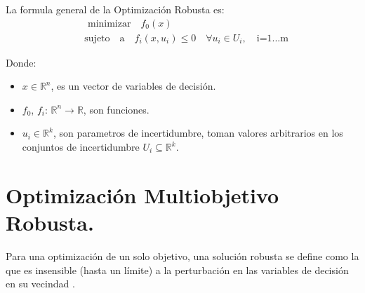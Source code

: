 
La formula general de la Optimización Robusta es:
\begin{equation} \label{ro}
\begin{split}
& \textrm{ minimizar} \quad f_{0}(x) \\
& \textrm{sujeto} \quad \textrm{a} \quad f_{i}(x,u_{i}) \leq 0 \quad \forall u_{i} \in U_{i}, \quad \textrm{i=1...m}
\end{split}
\end{equation}


Donde:
\begin{itemize}
     \item $x \in \mathbb{R}^{n}$, es un vector de variables de decisión.
     \item $f_{0}$, $f_{i}$: \quad$\mathbb{R}^{n} \rightarrow \mathbb{R}$, son funciones.
     \item $u_{i} \in \mathbb{R}^{k}$, son parametros de incertidumbre, toman valores arbitrarios en los conjuntos de incertidumbre $U_{i} \subseteq \mathbb{R}^{k}$.
 \end{itemize}
 



\section{Optimización Multiobjetivo Robusta.}
\label{sec:multiRo}

Para una optimización de un solo objetivo, una solución robusta se define como la que es insensible (hasta un límite) a la perturbación en las variables de decisión en su vecindad \cite{Deb2006IntroducingRI}.

